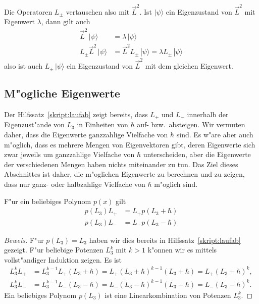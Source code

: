Die Operatoren $L_\pm$ vertauschen also mit $\vec L^2$.
Ist $|\psi\rangle$ ein Eigenzustand von $\vec L^2$ mit Eigenwert $\lambda$,
dann gilt auch 
\begin{align*}
\vec L^2\,|\psi\rangle&=\lambda\,|\psi\rangle
\\
L_\pm\vec L^2\,|\psi\rangle&=
\vec L^2L_\pm\,|\psi\rangle=
\lambda L_\pm\,|\psi\rangle
\end{align*}
also ist  auch $L_\pm\,|\psi\rangle$ ein Eigenzustand von $\vec L^2$ mit
dem gleichen Eigenwert.

\subsection{M"ogliche Eigenwerte}
Der Hilfssatz~\ref{skript:laufab} zeigt bereits, dass $L_+$ und $L_-$
innerhalb der Eigenzust"ande von $L_3$ in Einheiten von $\hbar$
auf- bzw.~absteigen. 
Wir vermuten daher, dass die Eigenwerte ganzzahlige Vielfache von $\hbar$
sind.
Es w"are aber auch m"oglich, dass es mehrere Mengen von Eigenvektoren
gibt, deren Eigenwerte sich zwar jeweils um ganzzahlige Vielfache von $\hbar$
unterscheiden, aber die Eigenwerte der verschiedenen Mengen haben nichts
miteinander zu tun.
Das Ziel dieses Abschnittes ist daher, die m"oglichen Eigenwerte zu
berechnen und zu zeigen, dass nur ganz- oder halbzahlige Vielfache von
$\hbar$ m"oglich sind.

\begin{hilfssatz}
F"ur ein beliebiges Polynom $p(x)$ gilt
\begin{align*}
p(L_3)L_+ &= L_+ p(L_3+\hbar)\\
p(L_3)L_- &= L_- p(L_3-\hbar)
\end{align*}
\end{hilfssatz}

\begin{proof}[Beweis]
F"ur $p(L_3)=L_3$ haben wir dies bereits in Hilfssatz~\ref{skript:laufab}
gezeigt.
F"ur beliebige Potenzen $L_3^k$ mit $k>1$
k"onnen wir es mittels vollst"andiger Induktion zeigen.
Es ist
\begin{align*}
L_3^kL_+ &= L_3^{k-1}L_+(L_3+\hbar) = L_+(L_3+\hbar)^{k-1}(L_3+\hbar)
= L_+(L_3+\hbar)^k,
\\
L_3^kL_- &= L_3^{k-1}L_-(L_3-\hbar) = L_-(L_3-\hbar)^{k-1}(L_3-\hbar)
= L_-(L_3-\hbar)^k.
\end{align*}
Ein beliebiges Polynom $p(L_3)$ ist eine Linearkombination von Potenzen
$L_3^k$.
\end{proof}


